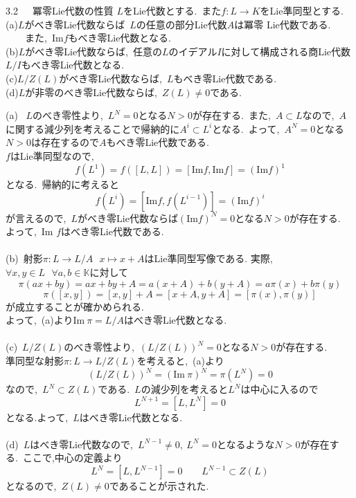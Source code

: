\documentclass[uplatex,dvipdfmx]{jsarticle}
\begin{document}
\begin{myprop}{3.2~~~冪零Lie代数の性質}
    $L$をLie代数とする.~また$f:L\to K$をLie準同型とする.\\
    (a)$L$がべき零Lie代数ならば~$L$の任意の部分Lie代数$A$は冪零 Lie代数である.\\
    ~~~~また,~$\text{Im} f$もべき零Lie代数となる.\\
    (b)$L$がべき零Lie代数ならば,~任意の$L$のイデアル$I$に対して構成される商Lie代数$L/I$もべき零Lie代数となる.\\
    (c)$L/Z(L)$がべき零Lie代数ならば,~$L$もべき零Lie代数である.\\
    (d)$L$が非零のべき零Lie代数ならば,~$Z(L)\neq 0$である.
\end{myprop}
\begin{myproof}
(a)~
$L$のべき零性より,~$L^N=0$となる$N>0$が存在する.~また,~$A\subset L$なので,~$A$に関する減少列を考えることで帰納的に$A^i \subset L^i$となる.~よって,~$A^N=0$となる$N>0$は存在するので$A$もべき零Lie代数である.\\
$f$はLie準同型なので,
\begin{equation*}
    f(L^1)=f([L,L])=[\text{Im}f,\text{Im}f]=(\text{Im}f)^1
\end{equation*}
となる.~帰納的に考えると
\begin{equation*}
    f(L^i)= [\text{Im}f,f(L^{i-1})]=(\text{Im}f)^i
\end{equation*}
が言えるので,~$L$がべき零Lie代数ならば$(\text{Im}f)^N=0$となる$N>0$が存在する.\\
よって,~Im $f$はべき零Lie代数である.\\\\
(b)~射影$\pi : L\to L/A ~~~x\mapsto x+A$はLie準同型写像である.
実際,~$\forall x,y \in L~~~\forall a,b \in \mathbb{K}$に対して
\begin{equation*}
    \pi(ax+by)=ax+by+A = a(x+A)+b(y+A) = a\pi (x)+b\pi (y)
\end{equation*}
\begin{equation*}
    \pi ([x,y])=[x,y]+A = [x+A,y+A]=[\pi(x),\pi(y)]
\end{equation*}
が成立することが確かめられる.\\
よって,~(a)より$\text{Im}~\pi = L/A$はべき零Lie代数となる.\\\\
(c)~$L/Z(L)$のべき零性より,~$(L/Z(L))^N=0$となる$N>0$が存在する.\\
準同型な射影$\pi:L\to L/Z(L)$を考えると,~(a)より
\begin{equation*}
    (L/Z(L))^N =(\text{Im}~\pi)^N=\pi(L^N)=0
\end{equation*}
なので,~$L^N\subset Z(L)$である.~$L$の減少列を考えると$L^N$は中心に入るので
\begin{equation*}
    L^{N+1}=[L,L^N]=0
\end{equation*}
となる.よって,~$L$はべき零Lie代数となる.\\\\
(d)~$L$はべき零Lie代数なので,~$L^{N-1}\neq 0,~L^N=0$となるような$N>0$が存在する.~ここで,中心の定義より
\begin{equation*}
    L^N=[L,L^{N-1}]=0~~~~~~~~~L^{N-1}\subset Z(L)
\end{equation*}
となるので,~$Z(L)\neq 0$であることが示された.
\end{myproof}
\end{document}
